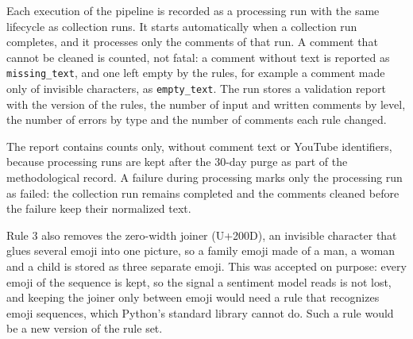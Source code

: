 Each execution of the pipeline is recorded as a processing run with the same lifecycle as collection runs. It starts automatically when a collection run completes, and it processes only the comments of that run. A comment that cannot be cleaned is counted, not fatal: a comment without text is reported as \texttt{missing\_\allowbreak text}, and one left empty by the rules, for example a comment made only of invisible characters, as \texttt{empty\_\allowbreak text}. The run stores a validation report with the version of the rules, the number of input and written comments by level, the number of errors by type and the number of comments each rule changed.

The report contains counts only, without comment text or YouTube identifiers, because processing runs are kept after the 30-day purge as part of the methodological record. A failure during processing marks only the processing run as failed: the collection run remains completed and the comments cleaned before the failure keep their normalized text.

Rule 3 also removes the zero-width joiner (U+200D), an invisible character that glues several emoji into one picture, so a family emoji made of a man, a woman and a child is stored as three separate emoji. This was accepted on purpose: every emoji of the sequence is kept, so the signal a sentiment model reads is not lost, and keeping the joiner only between emoji would need a rule that recognizes emoji sequences, which Python's standard library cannot do. Such a rule would be a new version of the rule set.
